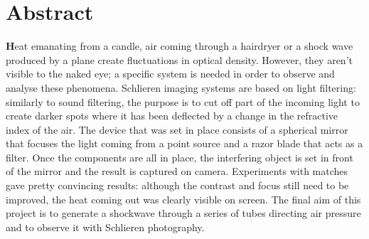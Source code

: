 \section*{Abstract}
\textbf{H}eat emanating from a candle, air coming through a hairdryer or a shock wave produced by a plane create
fluctuations in optical density. However, they aren't visible to the naked eye; a specific system is needed
in order to observe and analyse these phenomena. Schlieren imaging systems are based on light filtering:
similarly to sound filtering, the purpose is to cut off part of the incoming light to create darker spots
where it has been deflected by a change in the refractive index of the air. The device that was set in place
consists of a spherical mirror that focuses the light coming from a point source and a razor blade that acts
as a filter. Once the components are all in place, the interfering object is set in front of the mirror and the
result is captured on camera. Experiments with matches gave pretty convincing results: although the
contrast and focus still need to be improved, the heat coming out was clearly visible on screen. The final
aim of this project is to generate a shockwave through a series of tubes directing air pressure and to
observe it with Schlieren photography.
